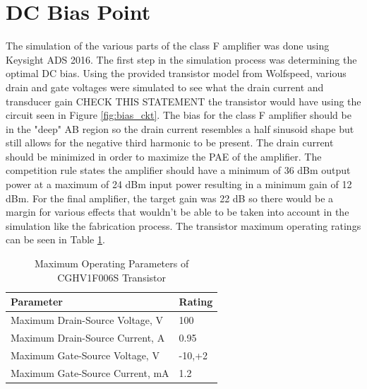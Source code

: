 \section{DC Bias Point}
The simulation of the various parts of the class F amplifier was done using Keysight ADS 2016. The first step in the simulation process was determining the optimal DC bias. Using the provided transistor model from Wolfspeed, various drain and gate voltages were simulated to see what the drain current and transducer gain CHECK THIS STATEMENT the transistor would have using the circuit seen in Figure \ref{fig:bias_ckt}. The bias for the class F amplifier should be in the "deep" AB region so the drain current resembles a half sinusoid shape but still allows for the negative third harmonic to be present. The drain current should be minimized in order to maximize the PAE of the amplifier. The competition rule states the amplifier should have a minimum of 36 dBm output power at a maximum of 24 dBm input power resulting in a minimum gain of 12 dBm. For the final amplifier, the target gain was 22 dB so there would be a margin for various effects that wouldn't be able to be taken into account in the simulation like the fabrication process. The transistor maximum operating ratings can be seen in Table \ref{table:trans_param}.

\begin{table}
    \centering
    \caption{Maximum Operating Parameters of CGHV1F006S Transistor}
    \label{table:trans_param}
    \begin{tabular}{|l|l|}
      \hline
      {Parameter} & {Rating}\\ \hline
      {Maximum Drain-Source Voltage, V} & 100 \\ \hline
      {Maximum Drain-Source Current, A} & 0.95\\ \hline
      {Maximum Gate-Source Voltage, V}  & -10,+2 \\ \hline
      {Maximum Gate-Source Current, mA} & 1.2 \\ \hline
    \end{tabular}
\end{table}


